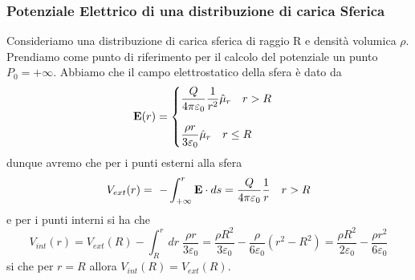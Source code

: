\subsubsection{Potenziale Elettrico di una distribuzione di carica Sferica}
Consideriamo una distribuzione di carica sferica di raggio R e densit\`a volumica $\rho$. Prendiamo come punto di riferimento per il calcolo del potenziale un punto $P_0 = + \infty $. Abbiamo che il campo elettrostatico della sfera \`e dato da 
\begin{equation*}
	\bold{E}(r) =  \left \{\begin{aligned}
		& \frac{Q}{4 \pi \varepsilon_0} \frac{1}{r^2}\hat{\mu}_{r} \quad r > R & \\[0.3cm]
		& \frac{\rho r}{3\varepsilon_0}\hat{\mu}_{r} \quad r \leq R
	\end{aligned}\right.
\end{equation*}
dunque avremo che per i punti esterni alla sfera 
\begin{equation*}
	V_{ext}(r) =\ - \int_{+ \infty}^{r} \bold{E} \cdot ds = \frac{Q}{4 \pi \varepsilon_0} \frac{1}{r} \quad r >R 
\end{equation*}
e per i punti interni si ha che
\begin{equation*}
	V_{int}(r) = V_{ext}(R) - \int_{R}^{r} dr \; \frac{\rho r}{3\varepsilon_0} = \frac{\rho R^2}{3 \varepsilon_0} - \frac{\rho}{6 \varepsilon_0}(r^2-R^2) = \frac{\rho R^2}{2 \varepsilon_0} - \frac{\rho r^2}{6 \varepsilon_0} 
\end{equation*} 
si che per $r = R$ allora $V_{int}(R) = V_{ext}(R)$.

